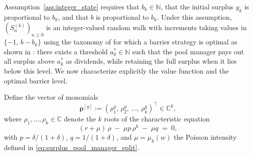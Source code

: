 Assumption~\ref{ass:integer_state} requires that $b_k \in \mathbb{N}$, that the initial surplus
$y_k$ is proportional to $b_k$, and that $b$ is proportional to $b_k$. Under this assumption, $(S_n^{(k)})_{n \geq 0}$ is an integer-valued random walk with increments taking
values in $\{-1,\, b-b_k\}$ using the taxonomy of \citet{gerber1972games} for which a barrier strategy is optimal as shown in \citet{miyasawa1961economic}: there
exists a threshold $a_k^* \in \mathbb{N}$ such that the pool manager pays out all surplus above
$a_k^*$ as dividends, while retaining the full surplus when it lies below this level. We now characterize explicitly the value function and the optimal barrier level.

Define the vector of monomials
\begin{equation}\label{eq:rho_vector}
    \bm{\rho}^{[y]} := \left(\rho_1^y,\, \rho_2^y,\, \dots,\, \rho_k^y\right)^\top \in \mathbb{C}^k,
\end{equation}
where $\rho_1, \dots, \rho_k \in \mathbb{C}$ denote the $k$ roots of the characteristic equation
\begin{equation}\label{eq:characteristic}
    (r + \mu)\,\rho \;-\; \mu p\,\rho^{k} \;-\; \mu q \;=\; 0,
\end{equation}
with $p = \delta/(1+\delta)$, $q = 1/(1+\delta)$, and $\mu = \mu_k(w)$ the Poisson intensity
defined in \eqref{eq:surplus_pool_manager_split}.

